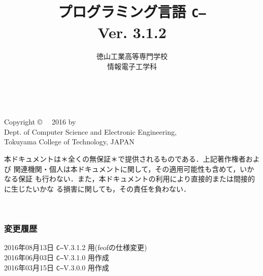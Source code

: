 \documentclass[11pt,a4j,twoside,dvipdfmx]{jbook}
\newcommand{\ver}{Ver. 3.1.2}
\newcommand{\cmm}{{\tt C--}}
\begin{document}
\setlength{\oddsidemargin}{10pt}
\setlength{\evensidemargin}{-10pt}
\setlength{\headsep}{1cm}
\frontmatter

\title{プログラミング言語 \cmm \\\ver}
\author{徳山工業高等専門学校\\情報電子工学科}
\date{}

\maketitle

\thispagestyle{empty}
~
\vfill
\begin{flushleft}
Copyright \copyright ~~ 2016 by \\
Dept. of Computer Science and Electronic Engineering, \\
Tokuyama College of Technology, JAPAN
\end{flushleft}

\vspace{0.8cm}

本ドキュメントは＊全くの無保証＊で提供されるものである．上記著作権者および
関連機関・個人は本ドキュメントに関して，その適用可能性も含めて，いかなる保証
も行わない．また，本ドキュメントの利用により直接的または間接的に生じたいかな
る損害に関しても，その責任を負わない．
\setcounter{page}{0}

\tableofcontents

\mainmatter

\appendix

\backmatter
\pagestyle{empty}
\onecolumn
~
\subsubsection{変更履歴}
\begin{flushleft}
2016年08月13日 \cmm V.3.1.2 用(feofの仕様変更)  \\
2016年06月03日 \cmm V.3.1.0 用作成  \\
2016年03月15日 \cmm V.3.0.0 用作成  \\
\end{flushleft}
\end{document}
